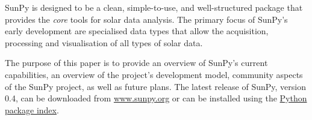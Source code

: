 SunPy is designed to be a clean, simple-to-use, and well-structured 
package that provides the \textit{core} tools for solar data analysis. 
The primary focus of SunPy's early development are 
specialised data types that allow the acquisition, processing and 
visualisation of all types of solar data.

The purpose of this paper is to provide an overview of SunPy's current 
capabilities, an overview of the project's development model, community aspects of the 
SunPy project, as well as future plans. The latest release of SunPy, version 0.4,
can be downloaded from \href{http://sunpy.org}{www.sunpy.org} or can be
installed using the \href{http://pypi.python.org/pypi}{Python package index}.
